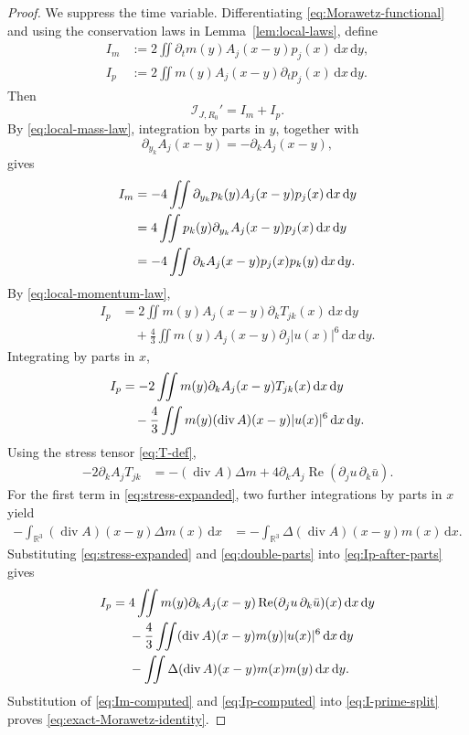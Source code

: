 \documentclass{interact}
\numberwithin{equation}{section}
\theoremstyle{plain}
\theoremstyle{definition}
\theoremstyle{remark}
\newcommand{\R}{\mathbb R}
\newcommand{\Rea}{\operatorname{Re}}
\newcommand{\dd}{\,\mathrm d}
\begin{document}
\begin{proof}
We suppress the time variable. Differentiating \eqref{eq:Morawetz-functional} and using the conservation laws in Lemma~\ref{lem:local-laws}, define
\begin{align*}
 I_m&:=2\iint \partial_tm(y)A_j(x-y)p_j(x)\dd x\dd y,\\
 I_p&:=2\iint m(y)A_j(x-y)\partial_tp_j(x)\dd x\dd y.
\end{align*}
Then
\begin{equation}\label{eq:I-prime-split}
 \mathcal I_{J,R_0}'=I_m+I_p.
\end{equation}
By \eqref{eq:local-mass-law}, integration by parts in $y$, together with
\[
 \partial_{y_k}A_j(x-y)=-\partial_kA_j(x-y),
\]
gives
\begin{align}
 I_m
 &=-4\iint \partial_{y_k}p_k(y)A_j(x-y)p_j(x)\dd x\dd y
 \notag\\
 &=4\iint p_k(y)\partial_{y_k}A_j(x-y)p_j(x)\dd x\dd y
 \notag\\
 &=-4\iint \partial_kA_j(x-y)p_j(x)p_k(y)\dd x\dd y.
 \label{eq:Im-computed}
\end{align}
By \eqref{eq:local-momentum-law},
\begin{align*}
 I_p
 &=2\iint m(y)A_j(x-y)\partial_kT_{jk}(x)\dd x\dd y\\
 &\quad+\frac43\iint m(y)A_j(x-y)\partial_j|u(x)|^6\dd x\dd y.
\end{align*}
Integrating by parts in $x$,
\begin{align}
 I_p
 &=-2\iint m(y)\partial_kA_j(x-y)T_{jk}(x)\dd x\dd y
 \notag\\
 &\quad-\frac43\iint m(y)(\operatorname{div}A)(x-y)|u(x)|^6\dd x\dd y.
 \label{eq:Ip-after-parts}
\end{align}
Using the stress tensor \eqref{eq:T-def},
\begin{align}
 -2\partial_kA_jT_{jk}
 &=-(\operatorname{div}A)\Delta m
 +4\partial_kA_j\Rea(\partial_ju\,\partial_k\bar u).
 \label{eq:stress-expanded}
\end{align}
For the first term in \eqref{eq:stress-expanded}, two further integrations by parts in $x$ yield
\begin{align}
 -\int_{\R^3}(\operatorname{div}A)(x-y)\Delta m(x)\dd x
 &=-\int_{\R^3}\Delta(\operatorname{div}A)(x-y)m(x)\dd x.
 \label{eq:double-parts}
\end{align}
Substituting \eqref{eq:stress-expanded} and \eqref{eq:double-parts} into \eqref{eq:Ip-after-parts} gives
\begin{align}
 I_p
 ={}&4\iint m(y)\partial_kA_j(x-y)
 \Rea(\partial_ju\,\partial_k\bar u)(x)\dd x\dd y
 \notag\\
 &-\frac43\iint
 (\operatorname{div}A)(x-y)m(y)|u(x)|^6\dd x\dd y
 \notag\\
 &-\iint
 \Delta(\operatorname{div}A)(x-y)m(x)m(y)\dd x\dd y.
 \label{eq:Ip-computed}
\end{align}
Substitution of \eqref{eq:Im-computed} and \eqref{eq:Ip-computed} into \eqref{eq:I-prime-split} proves \eqref{eq:exact-Morawetz-identity}.


\end{proof}
\end{document}
